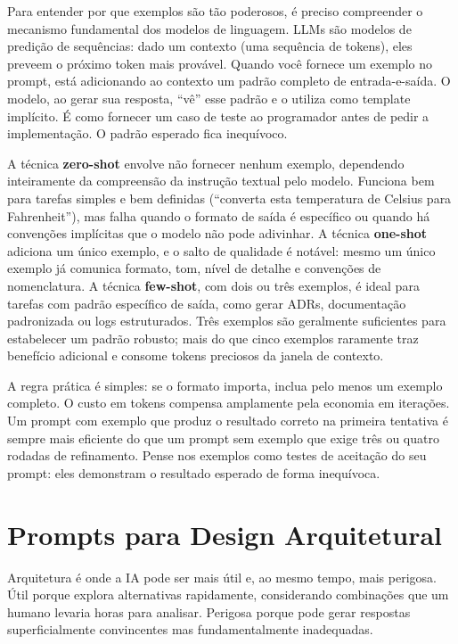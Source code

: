 Para entender por que exemplos são tão poderosos, é preciso compreender o
mecanismo fundamental dos modelos de linguagem. LLMs são modelos de
predição de sequências: dado um contexto (uma sequência de tokens), eles preveem
o próximo token mais provável. Quando você fornece um exemplo no prompt, está
adicionando ao contexto um padrão completo de entrada-e-saída. O modelo, ao gerar
sua resposta, ``vê'' esse padrão e o utiliza como template implícito. É como
fornecer um caso de teste ao programador antes de pedir a implementação. O
padrão esperado fica inequívoco.

A técnica \textbf{zero-shot} envolve não fornecer nenhum exemplo, dependendo
inteiramente da compreensão da instrução textual pelo modelo. Funciona bem para
tarefas simples e bem definidas (``converta esta temperatura de Celsius para
Fahrenheit''), mas falha quando o formato de saída é específico ou quando há
convenções implícitas que o modelo não pode adivinhar. A técnica \textbf{one-shot}
adiciona um único exemplo, e o salto de qualidade é notável: mesmo um único
exemplo já comunica formato, tom, nível de detalhe e convenções de nomenclatura.
A técnica \textbf{few-shot}, com dois ou três exemplos, é ideal para tarefas com
padrão específico de saída, como gerar ADRs, documentação padronizada ou logs
estruturados. Três exemplos são geralmente suficientes para estabelecer um
padrão robusto; mais do que cinco exemplos raramente traz benefício adicional e
consome tokens preciosos da janela de contexto.

A regra prática é simples: se o formato importa, inclua pelo menos um exemplo
completo. O custo em tokens compensa amplamente pela economia em iterações. Um
prompt com exemplo que produz o resultado correto na primeira tentativa é sempre
mais eficiente do que um prompt sem exemplo que exige três ou quatro rodadas de
refinamento. Pense nos exemplos como testes de aceitação do seu prompt: eles
demonstram o resultado esperado de forma inequívoca.

\section{Prompts para Design Arquitetural}

Arquitetura é onde a IA pode ser mais útil e, ao mesmo tempo, mais perigosa. Útil porque
explora alternativas rapidamente, considerando combinações que um humano
levaria horas para analisar. Perigosa porque pode gerar respostas
superficialmente convincentes mas fundamentalmente inadequadas.

